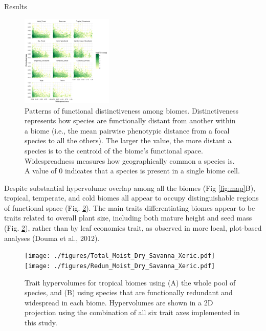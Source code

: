 \documentclass[final]{beamer}
\newlength{\twocolwid}
\begin{document}
\begin{frame}[t]
\begin{columns}[t]
\begin{column}{\twocolwid}
\begin{alertblock}{Results}
\begin{multicols}{2}
\begin{figure}[h]
	\centering
	\includegraphics[width=0.39\textwidth]{./figures/All_biomes_heatmap_logTraits.pdf}
	\caption{Patterns of functional distinctiveness among biomes. Distinctiveness represents how species are functionally distant from another within a biome (i.e., the mean pairwise phenotypic distance from a focal species to all the others). The larger the value, the more distant a species is to the centroid of the biome's functional space. Widespreadness measures how geographically common a species is. A value of 0 indicates that a species is present in a single biome cell. }
	\label{fig:distinct_common}
\end{figure}


   Despite substantial hypervolume overlap among all the biomes (Fig \ref{fig:map}B), tropical, temperate, and cold biomes all appear to occupy distinguishable regions of functional space (Fig. \ref{fig:hypervolumes}). The main traits differentiating biomes appear to be traits related to overall plant size, including both mature height and seed mass (Fig. \ref{fig:hypervolumes}), rather than by leaf economics trait, as observed in more local, plot-based analyses (Douma et al., 2012).   		

\begin{figure}[h]
	\centering
	\texttt{[image: ./figures/Total\_Moist\_Dry\_Savanna\_Xeric.pdf]}
	~
	\texttt{[image: ./figures/Redun\_Moist\_Dry\_Savanna\_Xeric.pdf]}
	\caption{Trait hypervolumes for tropical biomes using (A) the whole pool of species, and (B) using species that are functionally
redundant and widespread in each biome. Hypervolumes are shown in a 2D projection using the combination of all six trait axes implemented
in this study.}
	\label{fig:hypervolumes}
\end{figure}


\end{multicols}
\end{alertblock}
\end{column}
\end{columns}
\end{frame}
\end{document}
